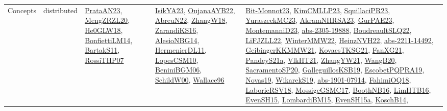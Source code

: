 {\begin{longtable}{llp{6cm}p{6cm}p{6cm}}
Concepts & distributed & \href{articles/PrataAN23.pdf}{PrataAN23}\cite{PrataAN23}, \href{articles/MengZRZL20.pdf}{MengZRZL20}\cite{MengZRZL20}, \href{papers/He0GLW18.pdf}{He0GLW18}\cite{He0GLW18}, \href{papers/BonfiettiLM14.pdf}{BonfiettiLM14}\cite{BonfiettiLM14}, \href{articles/BartakS11.pdf}{BartakS11}\cite{BartakS11}, \href{papers/RossiTHP07.pdf}{RossiTHP07}\cite{RossiTHP07} & \href{articles/IsikYA23.pdf}{IsikYA23}\cite{IsikYA23}, \href{papers/OujanaAYB22.pdf}{OujanaAYB22}\cite{OujanaAYB22}, \href{articles/AbreuN22.pdf}{AbreuN22}\cite{AbreuN22}, \href{articles/ZhangW18.pdf}{ZhangW18}\cite{ZhangW18}, \href{articles/ZarandiKS16.pdf}{ZarandiKS16}\cite{ZarandiKS16}, \href{papers/AlesioNBG14.pdf}{AlesioNBG14}\cite{AlesioNBG14}, \href{papers/HermenierDL11.pdf}{HermenierDL11}\cite{HermenierDL11}, \href{articles/LopesCSM10.pdf}{LopesCSM10}\cite{LopesCSM10}, \href{papers/BeniniBGM06.pdf}{BeniniBGM06}\cite{BeniniBGM06}, \href{articles/SchildW00.pdf}{SchildW00}\cite{SchildW00}, \href{articles/Wallace96.pdf}{Wallace96}\cite{Wallace96} & \href{papers/Bit-Monnot23.pdf}{Bit-Monnot23}\cite{Bit-Monnot23}, \href{papers/KimCMLLP23.pdf}{KimCMLLP23}\cite{KimCMLLP23}, \href{papers/SquillaciPR23.pdf}{SquillaciPR23}\cite{SquillaciPR23}, \href{papers/YuraszeckMC23.pdf}{YuraszeckMC23}\cite{YuraszeckMC23}, \href{articles/AkramNHRSA23.pdf}{AkramNHRSA23}\cite{AkramNHRSA23}, \href{articles/GurPAE23.pdf}{GurPAE23}\cite{GurPAE23}, \href{articles/MontemanniD23.pdf}{MontemanniD23}\cite{MontemanniD23}, \href{articles/abs-2305-19888.pdf}{abs-2305-19888}\cite{abs-2305-19888}, \href{papers/BoudreaultSLQ22.pdf}{BoudreaultSLQ22}\cite{BoudreaultSLQ22}, \href{papers/LiFJZLL22.pdf}{LiFJZLL22}\cite{LiFJZLL22}, \href{papers/WinterMMW22.pdf}{WinterMMW22}\cite{WinterMMW22}, \href{articles/HeinzNVH22.pdf}{HeinzNVH22}\cite{HeinzNVH22}, \href{articles/abs-2211-14492.pdf}{abs-2211-14492}\cite{abs-2211-14492}, \href{papers/GeibingerKKMMW21.pdf}{GeibingerKKMMW21}\cite{GeibingerKKMMW21}, \href{papers/KovacsTKSG21.pdf}{KovacsTKSG21}\cite{KovacsTKSG21}, \href{articles/FanXG21.pdf}{FanXG21}\cite{FanXG21}, \href{articles/PandeyS21a.pdf}{PandeyS21a}\cite{PandeyS21a}, \href{articles/VlkHT21.pdf}{VlkHT21}\cite{VlkHT21}, \href{articles/ZhangYW21.pdf}{ZhangYW21}\cite{ZhangYW21}, \href{papers/WangB20.pdf}{WangB20}\cite{WangB20}, \href{articles/SacramentoSP20.pdf}{SacramentoSP20}\cite{SacramentoSP20}, \href{papers/GalleguillosKSB19.pdf}{GalleguillosKSB19}\cite{GalleguillosKSB19}, \href{articles/EscobetPQPRA19.pdf}{EscobetPQPRA19}\cite{EscobetPQPRA19}, \href{articles/Novas19.pdf}{Novas19}\cite{Novas19}, \href{articles/WikarekS19.pdf}{WikarekS19}\cite{WikarekS19}, \href{articles/abs-1901-07914.pdf}{abs-1901-07914}\cite{abs-1901-07914}, \href{articles/FahimiOQ18.pdf}{FahimiOQ18}\cite{FahimiOQ18}, \href{articles/LaborieRSV18.pdf}{LaborieRSV18}\cite{LaborieRSV18}, \href{papers/MossigeGSMC17.pdf}{MossigeGSMC17}\cite{MossigeGSMC17}, \href{papers/BoothNB16.pdf}{BoothNB16}\cite{BoothNB16}, \href{papers/LimHTB16.pdf}{LimHTB16}\cite{LimHTB16}, \href{papers/EvenSH15.pdf}{EvenSH15}\cite{EvenSH15}, \href{papers/LombardiBM15.pdf}{LombardiBM15}\cite{LombardiBM15}, \href{articles/EvenSH15a.pdf}{EvenSH15a}\cite{EvenSH15a}, \href{papers/KoschB14.pdf}{KoschB14}\cite{KoschB14}, 
\end{longtable}}
